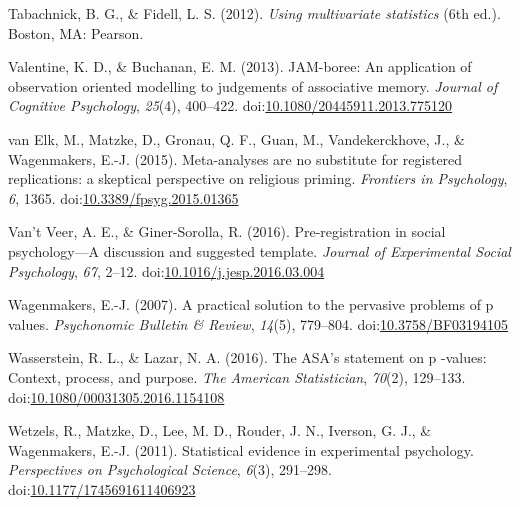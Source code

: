 \documentclass[english,man]{apa6}
\theoremstyle{definition}
\theoremstyle{definition}
\theoremstyle{definition}
\theoremstyle{remark}
\begin{document}
\hypertarget{ref-Tabachnick2012}{}
Tabachnick, B. G., \& Fidell, L. S. (2012). \emph{Using multivariate
statistics} (6th ed.). Boston, MA: Pearson.

\hypertarget{ref-Valentine2013}{}
Valentine, K. D., \& Buchanan, E. M. (2013). JAM-boree: An application
of observation oriented modelling to judgements of associative memory.
\emph{Journal of Cognitive Psychology}, \emph{25}(4), 400--422.
doi:\href{https://doi.org/10.1080/20445911.2013.775120}{10.1080/20445911.2013.775120}

\hypertarget{ref-VanElk2015}{}
van Elk, M., Matzke, D., Gronau, Q. F., Guan, M., Vandekerckhove, J., \&
Wagenmakers, E.-J. (2015). Meta-analyses are no substitute for
registered replications: a skeptical perspective on religious priming.
\emph{Frontiers in Psychology}, \emph{6}, 1365.
doi:\href{https://doi.org/10.3389/fpsyg.2015.01365}{10.3389/fpsyg.2015.01365}

\hypertarget{ref-VantVeer2016}{}
Van't Veer, A. E., \& Giner-Sorolla, R. (2016). Pre-registration in
social psychology---A discussion and suggested template. \emph{Journal
of Experimental Social Psychology}, \emph{67}, 2--12.
doi:\href{https://doi.org/10.1016/j.jesp.2016.03.004}{10.1016/j.jesp.2016.03.004}

\hypertarget{ref-Wagenmakers2007}{}
Wagenmakers, E.-J. (2007). A practical solution to the pervasive
problems of p values. \emph{Psychonomic Bulletin \& Review},
\emph{14}(5), 779--804.
doi:\href{https://doi.org/10.3758/BF03194105}{10.3758/BF03194105}

\hypertarget{ref-Wasserstein2016}{}
Wasserstein, R. L., \& Lazar, N. A. (2016). The ASA's statement on p
-values: Context, process, and purpose. \emph{The American
Statistician}, \emph{70}(2), 129--133.
doi:\href{https://doi.org/10.1080/00031305.2016.1154108}{10.1080/00031305.2016.1154108}

\hypertarget{ref-Wetzels2011}{}
Wetzels, R., Matzke, D., Lee, M. D., Rouder, J. N., Iverson, G. J., \&
Wagenmakers, E.-J. (2011). Statistical evidence in experimental
psychology. \emph{Perspectives on Psychological Science}, \emph{6}(3),
291--298.
doi:\href{https://doi.org/10.1177/1745691611406923}{10.1177/1745691611406923}
\end{document}
